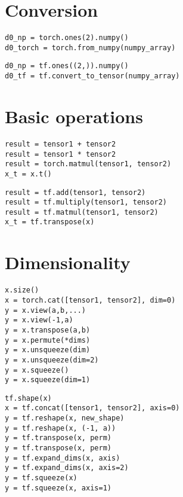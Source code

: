 \documentclass[24pt]{article}
\begin{document}
 
 
\section{Conversion}


\begin{multicols}{2}
\begin{lstlisting}
d0_np = torch.ones(2).numpy()
d0_torch = torch.from_numpy(numpy_array)
\end{lstlisting}
\columnbreak

\begin{lstlisting}
d0_np = tf.ones((2,)).numpy()
d0_tf = tf.convert_to_tensor(numpy_array)

\end{lstlisting}
\end{multicols}



\section{Basic operations}


\begin{multicols}{2}
\begin{lstlisting}
result = tensor1 + tensor2
result = tensor1 * tensor2
result = torch.matmul(tensor1, tensor2)
x_t = x.t()
\end{lstlisting}
\columnbreak

\begin{lstlisting}
result = tf.add(tensor1, tensor2)
result = tf.multiply(tensor1, tensor2)
result = tf.matmul(tensor1, tensor2)
x_t = tf.transpose(x)

\end{lstlisting}
\end{multicols}



\section{Dimensionality}


\begin{multicols}{2}
\begin{lstlisting}
x.size()                                  
x = torch.cat([tensor1, tensor2], dim=0)          
y = x.view(a,b,...)                       
y = x.view(-1,a)                          
y = x.transpose(a,b)                      
y = x.permute(*dims)                      
y = x.unsqueeze(dim)                      
y = x.unsqueeze(dim=2)                    
y = x.squeeze()                           
y = x.squeeze(dim=1)
\end{lstlisting}
\columnbreak

\begin{lstlisting}
tf.shape(x)
x = tf.concat([tensor1, tensor2], axis=0)
y = tf.reshape(x, new_shape)
y = tf.reshape(x, (-1, a))
y = tf.transpose(x, perm)
y = tf.transpose(x, perm)
y = tf.expand_dims(x, axis)
y = tf.expand_dims(x, axis=2)
y = tf.squeeze(x)
y = tf.squeeze(x, axis=1)
\end{lstlisting}
\end{multicols}
\end{document}
